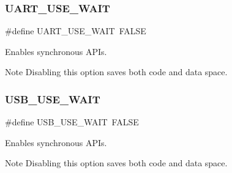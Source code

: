 \subsubsection{\texorpdfstring{U\+A\+R\+T\+\_\+\+U\+S\+E\+\_\+\+W\+A\+IT}{UART\_USE\_WAIT}}
{\footnotesize\ttfamily \#define U\+A\+R\+T\+\_\+\+U\+S\+E\+\_\+\+W\+A\+IT~F\+A\+L\+SE}



Enables synchronous A\+P\+Is. 

\begin{DoxyNote}{Note}
Disabling this option saves both code and data space. 
\end{DoxyNote}
\hypertarget{group__HAL__CONF_ga150144a73f541c7aca03c61f5ae16a6e}{}\label{group__HAL__CONF_ga150144a73f541c7aca03c61f5ae16a6e} 
\subsubsection{\texorpdfstring{U\+S\+B\+\_\+\+U\+S\+E\+\_\+\+W\+A\+IT}{USB\_USE\_WAIT}}
{\footnotesize\ttfamily \#define U\+S\+B\+\_\+\+U\+S\+E\+\_\+\+W\+A\+IT~F\+A\+L\+SE}



Enables synchronous A\+P\+Is. 

\begin{DoxyNote}{Note}
Disabling this option saves both code and data space. 
\end{DoxyNote}
